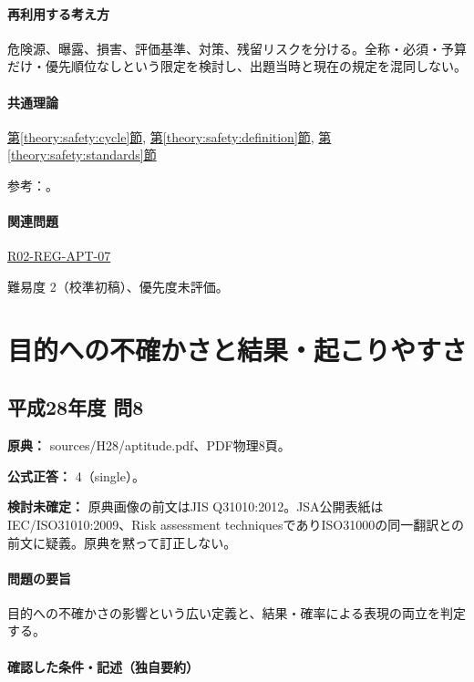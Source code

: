 \paragraph{再利用する考え方} 危険源、曝露、損害、評価基準、対策、残留リスクを分ける。全称・必須・予算だけ・優先順位なしという限定を検討し、出題当時と現在の規定を混同しない。

\paragraph{共通理論} \hyperref[theory:safety:cycle]{第\ref*{theory:safety:cycle}節}, \hyperref[theory:safety:definition]{第\ref*{theory:safety:definition}節}, \hyperref[theory:safety:standards]{第\ref*{theory:safety:standards}節}

\par 参考：\cite{saf_iso31000}。

\paragraph{関連問題} \hyperref[q:r02-reg-apt-07]{R02-REG-APT-07}

\par 難易度 2（校準初稿）、優先度未評価。

\section{目的への不確かさと結果・起こりやすさ}

\subsection{平成28年度 問8}
\label{q:h28-reg-apt-08}

\noindent\textbf{原典：} sources/H28/aptitude.pdf、PDF物理8頁。

\textbf{公式正答：} 4（single）。

\par\textbf{検討未確定：} 原典画像の前文はJIS Q31010:2012。JSA公開表紙はIEC/ISO31010:2009、Risk assessment techniquesでありISO31000の同一翻訳との前文に疑義。原典を黙って訂正しない。

\paragraph{問題の要旨} 目的への不確かさの影響という広い定義と、結果・確率による表現の両立を判定する。

\paragraph{確認した条件・記述（独自要約）}\mbox{}\par

